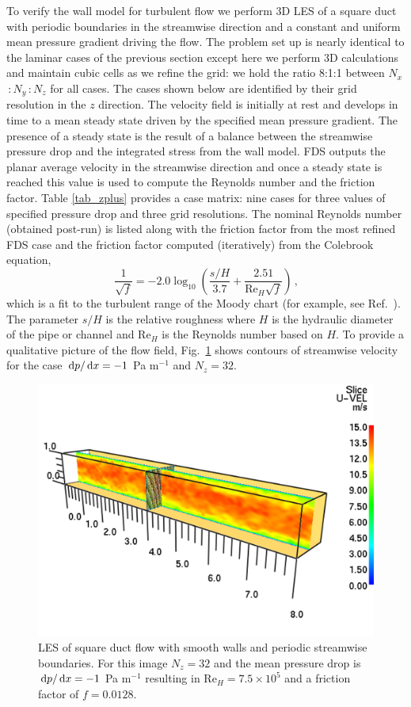 \documentclass[11pt]{book}
\begin{document}
To verify the wall model for turbulent flow we perform 3D LES of a square duct with periodic boundaries in the streamwise direction and a constant and uniform mean pressure gradient driving the flow.  The problem set up is nearly identical to the laminar cases of the previous section except here we perform 3D calculations and maintain cubic cells as we refine the grid: we hold the ratio 8:1:1 between $N_x$\,:\,$N_y$\,:\,$N_z$ for all cases.  The cases shown below are identified by their grid resolution in the $z$ direction.  The velocity field is initially at rest and develops in time to a mean steady state driven by the specified mean pressure gradient.  The presence of a steady state is the result of a balance between the streamwise pressure drop and the integrated stress from the wall model.  FDS outputs the planar average velocity in the streamwise direction and once a steady state is reached this value is used to compute the Reynolds number and the friction factor.  Table \ref{tab_zplus} provides a case matrix: nine cases for three values of specified pressure drop and three grid resolutions.  The nominal Reynolds number (obtained post-run) is listed along with the friction factor from the most refined FDS case and the friction factor computed (iteratively) from the Colebrook equation,
\begin{equation}
\label{eqn_colebrook}
\frac{1}{\sqrt{f}} = -2.0 \log_{10} \left( \frac{s/H}{3.7} + \frac{2.51}{\mbox{Re}_H\sqrt{f}} \right) \,\mbox{,}
\end{equation}
which is a fit to the turbulent range of the Moody chart (for example, see Ref.~\cite{MYO}).  The parameter $s/H$ is the relative
roughness where $H$ is the hydraulic diameter of the pipe or channel and Re$_H$ is the Reynolds number based on $H$.
To provide a qualitative picture of the flow field, Fig.~\ref{fig_channel_flow_setup} shows contours of streamwise velocity
for the case $\,\mathrm{d} p/\,\mathrm{d} x = -1$ Pa m$^{-1}$ and $N_z=32$.

\begin{figure}
\centering
\includegraphics[width=4.5in]{FIGURES/channel_flow_setup}
\caption[LES of square duct flow]{LES of square duct flow with smooth walls and periodic streamwise boundaries.  For this image $N_z=32$ and the mean pressure drop is $\,\mathrm{d} p/ \,\mathrm{d} x = -1$ Pa m$^{-1}$ resulting in Re$_H = 7.5\times 10^5$ and a friction factor of $f=0.0128$.}
\label{fig_channel_flow_setup}
\end{figure}
\end{document}
